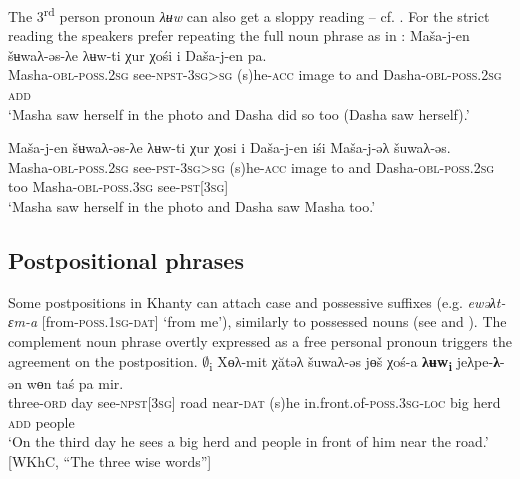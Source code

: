 \documentclass[output=paper]{langscibook}
\begin{document}


The 3\textsuperscript{rd} person pronoun \textit{λʉw} can also get a sloppy reading – cf. . For the strict reading the speakers prefer repeating the full noun phrase as in :
\ea 
\label{ex:Volkova:30}
	\ea
	\label{ex:Volkova:30a}
  	 \gll Maša-j-en  šʉwaλ-əs-λe λʉw-ti χur χośi i Daša-j-en pa.\\
  	 Masha\textsc{{}-obl-poss.2sg} see\textsc{{}-npst-3sg>sg} (s)he\textsc{{}-acc} image to and Dasha-\textsc{obl-poss.2sg} \textsc{add}\\
  	 \glt ‘Masha saw herself in the photo and Dasha did so too (Dasha saw herself).’

	\ex
	\label{ex:Volkova:30b}
  	 \gll Maša-j-en  šʉwaλ-əs-λe λʉw-ti χur χosi i Daša-j-en iśi Maša-j-əλ šuwaλ-əs.\\
  	 Masha\textsc{{}-obl-poss.2sg} see\textsc{{}-pst-3sg>sg} (s)he\textsc{{}-acc} image to and Dasha\textsc{{}-obl-poss.2sg} too Masha\textsc{{}-obl-poss.3sg} see\textsc{{}-pst[3sg]}\\
  	 \glt ‘Masha saw herself in the photo and Dasha saw Masha too.’
	\z
\z


\subsection{{Postpositional} {phrases}}\label{sec:Volkova:3.4}

Some postpositions in Khanty can attach case and possessive suffixes (e.g. \textit{ewəλt-ɛm-a} [from\textsc{{}-poss.1sg-dat}] ‘from me’), similarly to possessed nouns (see  and ). The complement noun phrase overtly expressed as a free personal pronoun triggers the agreement on the postposition.
\ea 
\label{ex:Volkova:31}
 \gll ${\emptyset}$\textsubscript{i} Xɵλ-mit χătəλ šuwaλ-əs jɵš χoś-a \textbf{ λʉw\textsubscript{i}} jeλpe-\textbf{λ}-ən wɵn taś pa mir.\\
 three\textsc{{}-ord} day see\textsc{{}-npst[3sg]} road near\textsc{{}-dat} (s)he in.front.of\textsc{{}-poss.3sg-loc} big herd \textsc{add} people\\
 \glt ‘On the third day he sees a big herd and people in front of him near the road.’ [WKhC, “The three wise words”]
\z


\end{document}
